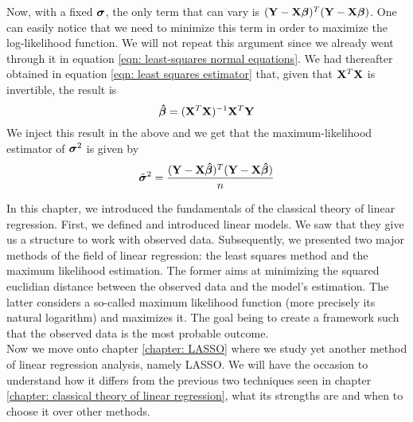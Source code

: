Now, with a fixed \(\boldsymbol{\sigma}\), the only term that can vary is \(( \mathbf{Y} - \mathbf{X} \boldsymbol{\beta} )^T ( \mathbf{Y} - \mathbf{X} \boldsymbol{\beta} )\). One can easily notice that we need to minimize this term in order to maximize the log-likelihood function. We will not repeat this argument since we already went through it in equation \eqref{eqn: least-squares normal equations}. We had thereafter obtained in equation \eqref{eqn: least squares estimator} that, given that \(\mathbf{X}^T \mathbf{X}\) is invertible, the result is
\[
    \boldsymbol{\hat{\beta}} = (\mathbf{X}^T \mathbf{X})^{-1} \mathbf{X}^T \mathbf{Y}
\]
We inject this result in the above and we get that the maximum-likelihood estimator of \(\boldsymbol{\sigma}^2\) is given by
\[
    \tilde {\boldsymbol{\sigma}}^2 = \frac{( \mathbf{Y} - \mathbf{X} \boldsymbol{\hat{\beta}} )^T ( \mathbf{Y} - \mathbf{X} \boldsymbol{\hat{\beta}} )}{n}
\]

In this chapter, we introduced the fundamentals of the classical theory of linear regression. First, we defined and introduced linear models. We saw that they give us a structure to work with observed data. Subsequently, we presented two major methods of the field of linear regression: the least squares method and the maximum likelihood estimation. The former aims at minimizing the squared euclidian distance between the observed data and the model's estimation. The latter considers a so-called maximum likelihood function (more precisely its natural logarithm) and maximizes it. The goal being to create a framework such that the observed data is the most probable outcome. \\
Now we move onto chapter \ref{chapter: LASSO} where we study yet another method of linear regression analysis, namely LASSO. We will have the occasion to understand how it differs from the previous two techniques seen in chapter \ref{chapter: classical theory of linear regression}, what its strengths are and when to choose it over other methods.